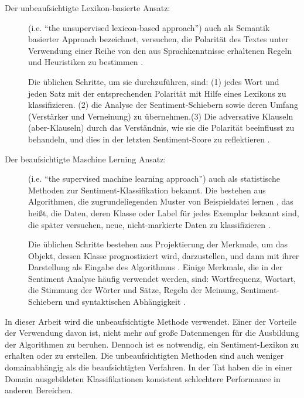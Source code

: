 \begin{description}
	\item[Der unbeaufsichtigte Lexikon-basierte Ansatz:] (\ac{i.e.} ``the unsupervised lexicon-based approach'') auch als Semantik basierter Approach bezeichnet, versuchen, die Polarität des Textes unter Verwendung einer Reihe von den aus Sprachkenntnisse erhaltenen Regeln und Heuristiken zu bestimmen \citep{Balazs2016}. 

Die üblichen Schritte, um sie durchzuführen, sind: (1) jedes Wort und jeden Satz mit der entsprechenden Polarität mit Hilfe eines Lexikons zu klassifizieren. (2) die Analyse der Sentiment-Schiebern sowie deren Umfang (Verstärker und Verneinung) zu übernehmen.(3) Die adversative Klauseln (aber-Klauseln) durch das Verständnis, wie sie die Polarität beeinflusst zu behandeln, und dies in der letzten Sentiment-Score zu reflektieren \citep{Liu2012}.
	\item[Der beaufsichtigte Maschine Lerning Ansatz:] (\ac{i.e.} ``the supervised machine learning approach'') auch als statistische Methoden zur Sentiment-Klassifikation bekannt. Die bestehen aus Algorithmen, die zugrundeliegenden Muster von Beispieldatei lernen \citep{webpattern2010}, das heißt, die Daten, deren Klasse oder Label für jedes Exemplar bekannt sind, die später versuchen, neue, nicht-markierte Daten zu klassifizieren \citep{mitchell1997machine}.

Die üblichen Schritte bestehen aus Projektierung der Merkmale, um das Objekt, dessen Klasse prognostiziert wird, darzustellen, und dann mit ihrer Darstellung als Eingabe des Algorithmus \citep{Balazs2016}. Einige Merkmale, die in der Sentiment Analyse häufig verwendet werden, sind: Wortfrequenz, Wortart, die Stimmung der Wörter und Sätze, Regeln der Meinung, Sentiment-Schiebern und syntaktischen Abhängigkeit \citep{Liu2012, Joshi:2009:GDF:1667583.1667680}.
\end{description}
In dieser Arbeit wird die unbeaufsichtigte Methode verwendet. Einer der Vorteile der Verwendung davon ist, nicht mehr auf große Datenmengen für die Ausbildung der Algorithmen zu beruhen. Dennoch ist es notwendig, ein Sentiment-Lexikon zu erhalten oder zu erstellen. Die unbeaufsichtigten Methoden sind auch weniger domainabhängig als die beaufsichtigten Verfahren. In der Tat haben die in einer Domain ausgebildeten Klassifikationen konsistent schlechtere Performance in anderen Bereichen. \citep{aue2005customizing,blitzer2007biographies} 
